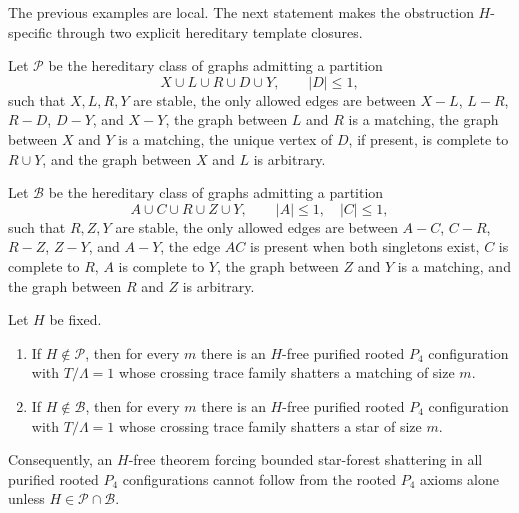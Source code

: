 The previous examples are local. The next statement makes the obstruction $H$-specific through two explicit hereditary template closures.

\begin{definition}\label{def:cube-closures}
Let $\mathcal P$ be the hereditary class of graphs admitting a partition
\[
  X\cup L\cup R\cup D\cup Y,
  \qquad |D|\le 1,
\]
such that $X,L,R,Y$ are stable, the only allowed edges are between $X-L$, $L-R$, $R-D$, $D-Y$, and $X-Y$, the graph between $L$ and $R$ is a matching, the graph between $X$ and $Y$ is a matching, the unique vertex of $D$, if present, is complete to $R\cup Y$, and the graph between $X$ and $L$ is arbitrary.

Let $\mathcal B$ be the hereditary class of graphs admitting a partition
\[
  A\cup C\cup R\cup Z\cup Y,
  \qquad |A|\le 1,
  \quad |C|\le 1,
\]
such that $R,Z,Y$ are stable, the only allowed edges are between $A-C$, $C-R$, $R-Z$, $Z-Y$, and $A-Y$, the edge $AC$ is present when both singletons exist, $C$ is complete to $R$, $A$ is complete to $Y$, the graph between $Z$ and $Y$ is a matching, and the graph between $R$ and $Z$ is arbitrary.
\end{definition}

\begin{theorem}\label{thm:H-specific-cubes}
Let $H$ be fixed.
\begin{enumerate}[label=(\roman*)]
\item If $H\notin\mathcal P$, then for every $m$ there is an $H$-free purified rooted $P_4$ configuration with $T/\Lambda=1$ whose crossing trace family shatters a matching of size $m$.
\item If $H\notin\mathcal B$, then for every $m$ there is an $H$-free purified rooted $P_4$ configuration with $T/\Lambda=1$ whose crossing trace family shatters a star of size $m$.
\end{enumerate}
Consequently, an $H$-free theorem forcing bounded star-forest shattering in all purified rooted $P_4$ configurations cannot follow from the rooted $P_4$ axioms alone unless $H\in\mathcal P\cap\mathcal B$.
\end{theorem}

